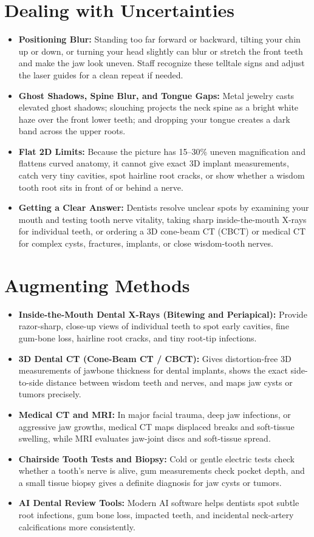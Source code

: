 \section{Dealing with Uncertainties}
\begin{itemize}
\item \textbf{Positioning Blur:} Standing too far forward or backward, tilting your chin up or down, or turning your head slightly can blur or stretch the front teeth and make the jaw look uneven. Staff recognize these telltale signs and adjust the laser guides for a clean repeat if needed.
\item \textbf{Ghost Shadows, Spine Blur, and Tongue Gaps:} Metal jewelry casts elevated ghost shadows; slouching projects the neck spine as a bright white haze over the front lower teeth; and dropping your tongue creates a dark band across the upper roots.
\item \textbf{Flat 2D Limits:} Because the picture has 15--30\% uneven magnification and flattens curved anatomy, it cannot give exact 3D implant measurements, catch very tiny cavities, spot hairline root cracks, or show whether a wisdom tooth root sits in front of or behind a nerve.
\item \textbf{Getting a Clear Answer:} Dentists resolve unclear spots by examining your mouth and testing tooth nerve vitality, taking sharp inside-the-mouth X-rays for individual teeth, or ordering a 3D cone-beam CT (CBCT) or medical CT for complex cysts, fractures, implants, or close wisdom-tooth nerves.
\end{itemize}

\section{Augmenting Methods}
\begin{itemize}
\item \textbf{Inside-the-Mouth Dental X-Rays (Bitewing and Periapical):} Provide razor-sharp, close-up views of individual teeth to spot early cavities, fine gum-bone loss, hairline root cracks, and tiny root-tip infections.
\item \textbf{3D Dental CT (Cone-Beam CT / CBCT):} Gives distortion-free 3D measurements of jawbone thickness for dental implants, shows the exact side-to-side distance between wisdom teeth and nerves, and maps jaw cysts or tumors precisely.
\item \textbf{Medical CT and MRI:} In major facial trauma, deep jaw infections, or aggressive jaw growths, medical CT maps displaced breaks and soft-tissue swelling, while MRI evaluates jaw-joint discs and soft-tissue spread.
\item \textbf{Chairside Tooth Tests and Biopsy:} Cold or gentle electric tests check whether a tooth's nerve is alive, gum measurements check pocket depth, and a small tissue biopsy gives a definite diagnosis for jaw cysts or tumors.
\item \textbf{AI Dental Review Tools:} Modern AI software helps dentists spot subtle root infections, gum bone loss, impacted teeth, and incidental neck-artery calcifications more consistently.
\end{itemize}

